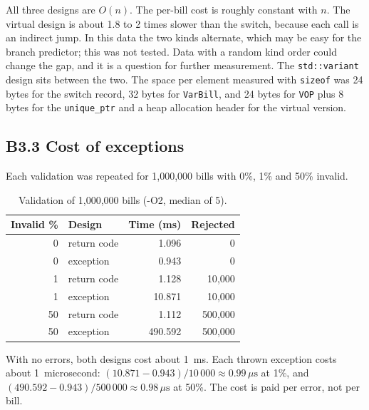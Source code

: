 \documentclass[11pt,a4paper]{article}
\begin{document}
\noindent All three designs are $O(n)$. The per-bill cost is roughly constant with $n$. The virtual design is about 1.8 to 2 times slower than the switch, because each call is an indirect jump. In this data the two kinds alternate, which may be easy for the branch predictor; this was not tested. Data with a random kind order could change the gap, and it is a question for further measurement. The \texttt{std::variant} design sits between the two. The space per element measured with \texttt{sizeof} was 24 bytes for the switch record, 32 bytes for \texttt{VarBill}, and 24 bytes for \texttt{VOP} plus 8 bytes for the \texttt{unique\_ptr} and a heap allocation header for the virtual version.

\subsection*{B3.3 Cost of exceptions}
Each validation was repeated for 1{,}000{,}000 bills with 0\%, 1\% and 50\% invalid.

\begin{table}[H]
\centering
\small
\begin{tabular}{@{}rlrr@{}}
\toprule
\textbf{Invalid \%} & \textbf{Design} & \textbf{Time (ms)} & \textbf{Rejected} \\
\midrule
0 & return code & 1.096 & 0 \\
0 & exception & 0.943 & 0 \\
1 & return code & 1.128 & 10{,}000 \\
1 & exception & 10.871 & 10{,}000 \\
50 & return code & 1.112 & 500{,}000 \\
50 & exception & 490.592 & 500{,}000 \\
\bottomrule
\end{tabular}
\caption{Validation of 1{,}000{,}000 bills (-O2, median of 5).}\label{tab:b33}
\end{table}

\noindent With no errors, both designs cost about 1~ms. Each thrown exception costs about 1~microsecond: $(10.871 - 0.943) / 10\,000 \approx 0.99\,\mu\text{s}$ at 1\%, and $(490.592 - 0.943) / 500\,000 \approx 0.98\,\mu\text{s}$ at 50\%. The cost is paid per error, not per bill.
\end{document}
